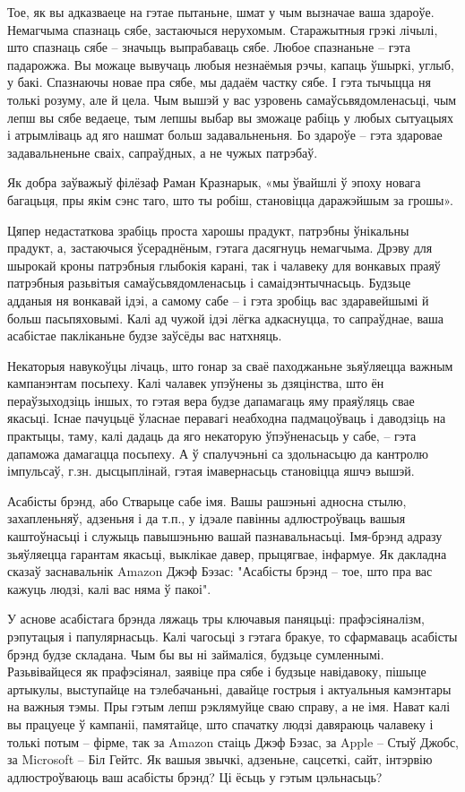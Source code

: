 Тое, як вы адказваеце на гэтае пытаньне, шмат у чым вызначае ваша здароўе. Немагчыма спазнаць сябе, застаючыся нерухомым. Старажытныя грэкі лічылі, што спазнаць сябе – значыць выпрабаваць сябе. Любое спазнаньне – гэта падарожжа. Вы можаце вывучаць любыя незнаёмыя рэчы, капаць ўшыркі, углыб, у бакі. Спазнаючы новае пра сябе, мы дадаём частку сябе. І гэта тычыцца ня толькі розуму, але й цела. Чым вышэй у вас узровень самаўсьвядомленасьці, чым лепш вы сябе ведаеце, тым лепшы выбар вы зможаце рабіць у любых сытуацыях і атрымліваць ад яго нашмат больш задавальненьня. Бо здароўе – гэта здаровае задавальненьне сваіх, сапраўдных, а не чужых патрэбаў.

Як добра заўважыў філёзаф Раман Кразнарык, «мы ўвайшлі ў эпоху новага багацьця, пры якім сэнс таго, што ты робіш, становіцца даражэйшым за грошы».

Цяпер недастаткова зрабіць проста харошы прадукт, патрэбны ўнікальны прадукт, а, застаючыся ўсераднёным, гэтага дасягнуць немагчыма. Дрэву для шырокай кроны патрэбныя глыбокія карані, так і чалавеку для вонкавых праяў патрэбныя разьвітыя самаўсьвядомленасьць і самаідэнтычнасьць. Будзьце адданыя ня вонкавай ідэі, а самому сабе – і гэта зробіць вас здаравейшымі й больш пасьпяховымі. Калі ад чужой ідэі лёгка адкаснуцца, то сапраўднае, ваша асабістае пакліканьне будзе заўсёды вас натхняць.

Некаторыя навукоўцы лічаць, што гонар за сваё паходжаньне зьяўляецца важным кампанэнтам посьпеху. Калі чалавек упэўнены зь дзяцінства, што ён пераўзыходзіць іншых, то гэтая вера будзе дапамагаць яму праяўляць свае якасьці. Існае пачуцьцё ўласнае перавагі неабходна падмацоўваць і даводзіць на практыцы, таму, калі дадаць да яго некаторую ўпэўненасьць у сабе, – гэта дапаможа дамагацца посьпеху. А ў спалучэньні са здольнасьцю да кантролю імпульсаў, г.зн. дысцыплінай, гэтая імавернасьць становіцца яшчэ вышэй.

Асабісты брэнд, або Стварыце сабе імя. Вашы рашэньні адносна стылю, захапленьняў, адзеньня і да т.п., у ідэале павінны адлюстроўваць вашыя каштоўнасьці і служыць павышэньню вашай пазнавальнасьці. Імя-брэнд адразу зьяўляецца гарантам якасьці, выклікае давер, прыцягвае, інфармуе. Як дакладна сказаў заснавальнік Amazon Джэф Бэзас: "Асабісты брэнд – тое, што пра вас кажуць людзі, калі вас няма ў пакоі".

У аснове асабістага брэнда ляжаць тры ключавыя паняцьці: прафэсіяналізм, рэпутацыя і папулярнасьць. Калі чагосьці з гэтага бракуе, то сфармаваць асабісты брэнд будзе складана. Чым бы вы ні займаліся, будзьце сумленнымі. Разьвівайцеся як прафэсіянал, заявіце пра сябе і будзьце навідавоку, пішыце артыкулы, выступайце на тэлебачаньні, давайце гострыя і актуальныя камэнтары на важныя тэмы. Пры гэтым лепш рэклямуйце сваю справу, а не імя. Нават калі вы працуеце ў кампаніі, памятайце, што спачатку людзі давяраюць чалавеку і толькі потым – фірме, так за Amazon стаіць Джэф Бэзас, за Apple – Стыў Джобс, за Microsoft – Біл Гейтс. Як вашыя звычкі, адзеньне, сацсеткі, сайт, інтэрвію адлюстроўваюць ваш асабісты брэнд? Ці ёсьць у гэтым цэльнасьць?

